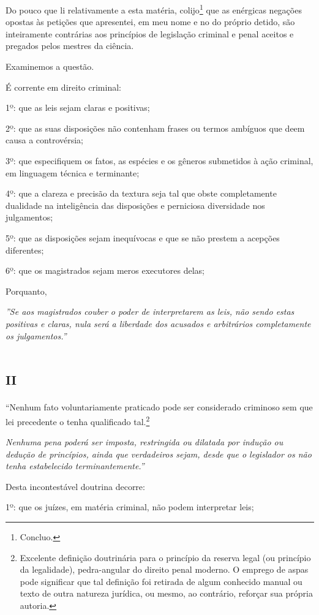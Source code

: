 Do pouco que li relativamente a esta matéria, colijo\footnote{Concluo.}
que as enérgicas negações opostas às petições que apresentei, em meu
nome e no do próprio detido, são inteiramente contrárias aos princípios
de legislação criminal e penal aceitos e pregados pelos mestres da
ciência.

Examinemos a questão.

É corrente em direito criminal:

1º: que as leis sejam claras e positivas;

2º: que as suas disposições não contenham frases ou termos ambíguos que
deem causa a controvérsia;

3º: que especifiquem os fatos, as espécies e os gêneros submetidos à
ação criminal, em linguagem técnica e terminante;

4º: que a clareza e precisão da textura seja tal que obste completamente
dualidade na inteligência das disposições e perniciosa diversidade nos
julgamentos;

5º: que as disposições sejam inequívocas e que se não prestem a acepções
diferentes;

6º: que os magistrados sejam meros executores delas;

Porquanto,

\emph{''Se aos magistrados couber o poder de interpretarem as leis, não
sendo estas positivas e claras, nula será a liberdade dos acusados e
arbitrários completamente os julgamentos.''}

\section{\textsc{ii}}

``Nenhum fato voluntariamente praticado pode ser considerado criminoso
sem que lei precedente o tenha qualificado tal.\footnote{Excelente
  definição doutrinária para o princípio da reserva legal (ou princípio
  da legalidade), pedra-angular do direito penal moderno. O emprego de
  aspas pode significar que tal definição foi retirada de algum
  conhecido manual ou texto de outra natureza jurídica, ou mesmo, ao
  contrário, reforçar sua própria autoria.}

\emph{Nenhuma pena poderá ser imposta, restringida ou dilatada por
indução ou dedução de princípios, ainda que verdadeiros sejam, desde que
o legislador os não tenha estabelecido terminantemente.''}

Desta incontestável doutrina decorre:

1º: que os juízes, em matéria criminal, não podem interpretar leis;

